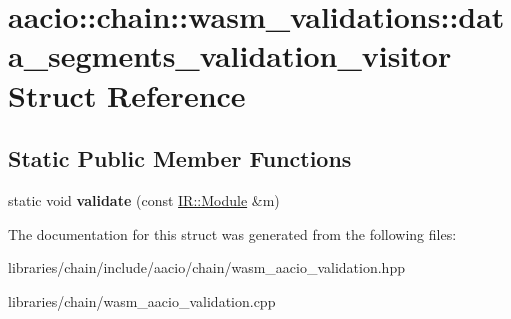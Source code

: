 \hypertarget{structaacio_1_1chain_1_1wasm__validations_1_1data__segments__validation__visitor}{}\section{aacio\+:\+:chain\+:\+:wasm\+\_\+validations\+:\+:data\+\_\+segments\+\_\+validation\+\_\+visitor Struct Reference}
\label{structaacio_1_1chain_1_1wasm__validations_1_1data__segments__validation__visitor}
\subsection*{Static Public Member Functions}
\begin{DoxyCompactItemize}
\item 
\mbox{\label{structaacio_1_1chain_1_1wasm__validations_1_1data__segments__validation__visitor_a84f5f72633d7031a31da1745aa45b5be}} 
static void {\bfseries validate} (const \mbox{\hyperlink{struct_i_r_1_1_module}{I\+R\+::\+Module}} \&m)
\end{DoxyCompactItemize}


The documentation for this struct was generated from the following files\+:\begin{DoxyCompactItemize}
\item 
libraries/chain/include/aacio/chain/wasm\+\_\+aacio\+\_\+validation.\+hpp\item 
libraries/chain/wasm\+\_\+aacio\+\_\+validation.\+cpp\end{DoxyCompactItemize}
